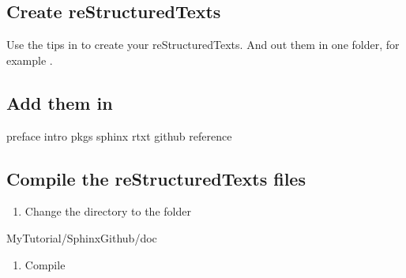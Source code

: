 \documentclass[letterpaper,12pt,english]{sphinxmanual}
\begin{document}
\subsection{Create reStructuredTexts}
\label{\detokenize{github:id1}}
Use the tips in {\hyperref[\detokenize{rtxt:rtext}]{}} to create your reStructuredTexts. And out them in one folder, for example .

\begin{figure}[htbp]
\centering

\noindent{}
\end{figure}


\subsection{Add them in }
\label{\detokenize{github:add-them-in-index-rst}}
\begin{sphinxVerbatim}[commandchars=\\\{\}]

 
    

   preface
   intro
   pkgs
   sphinx
   rtxt
   github
   reference
\end{sphinxVerbatim}


\subsection{Compile the reStructuredTexts files}
\label{\detokenize{github:compile-the-rests-files}}\begin{enumerate}
\def\theenumi{\arabic{enumi}}
\def\labelenumi{\theenumi .}
\makeatletter\def\p@enumii{\p@enumi \theenumi .}\makeatother
\item {} 
Change the directory to the folder

\end{enumerate}

\begin{sphinxVerbatim}[commandchars=\\\{\}]
 MyTutorial/SphinxGithub/doc
\end{sphinxVerbatim}
\begin{enumerate}
\def\theenumi{\arabic{enumi}}
\def\labelenumi{\theenumi .}
\makeatletter\def\p@enumii{\p@enumi \theenumi .}\makeatother
\setcounter{enumi}{1}
\item {} 
Compile

\end{enumerate}
\end{document}
